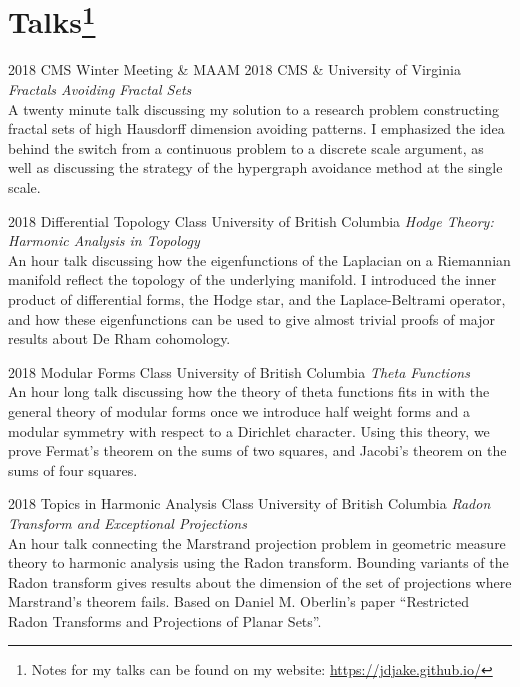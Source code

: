 \documentclass{friggeri-cv}
\begin{document}

\pagebreak[3]
\section{Talks\footnote{Notes for my talks can be found on my website: \href{https://jdjake.github.io/}{https://jdjake.github.io/}}} %

\begin{entrylist}


\entry
{2018}
{CMS Winter Meeting \& MAAM 2018}
{CMS \& University of Virginia}
{\emph{Fractals Avoiding Fractal Sets}\\
    A twenty minute talk discussing my solution to a research problem constructing fractal sets of high Hausdorff dimension avoiding patterns. I emphasized the idea behind the switch from a continuous problem to a discrete scale argument, as well as discussing the strategy of the hypergraph avoidance method at the single scale.
}


\entry
{2018}
{Differential Topology Class}
{University of British Columbia}
{\emph{Hodge Theory: Harmonic Analysis in Topology}\\
    An hour talk discussing how the eigenfunctions of the Laplacian on a Riemannian manifold reflect the topology of the underlying manifold. I introduced the inner product of differential forms, the Hodge star, and the Laplace-Beltrami operator, and how these eigenfunctions can be used to give almost trivial proofs of major results about De Rham cohomology.
}


\entry
{2018}
{Modular Forms Class}
{University of British Columbia}
{\emph{Theta Functions}\\
    An hour long talk discussing how the theory of theta functions fits in with the general theory of modular forms once we introduce half weight forms and a modular symmetry with respect to a Dirichlet character. Using this theory, we prove Fermat's theorem on the sums of two squares, and Jacobi's theorem on the sums of four squares.
}


\entry
{2018}
{Topics in Harmonic Analysis Class}
{University of British Columbia}
{\emph{Radon Transform and Exceptional Projections}\\
    An hour talk connecting the Marstrand projection problem in geometric measure theory to harmonic analysis using the Radon transform. Bounding variants of the Radon transform gives results about the dimension of the set of projections where Marstrand's theorem fails. Based on Daniel M. Oberlin's paper ``Restricted Radon Transforms and Projections of Planar Sets''.
} 

\end{entrylist}
\end{document}
